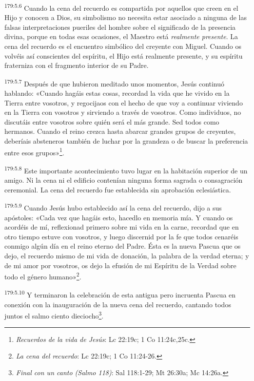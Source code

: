 \par 
\textsuperscript{179:5.6} Cuando la cena del recuerdo es compartida por aquellos que creen en el Hijo y conocen a Dios, su simbolismo no necesita estar asociado a ninguna de las falsas interpretaciones pueriles del hombre sobre el significado de la presencia divina, porque en todas esas ocasiones, el Maestro está \textit{realmente presente}. La cena del recuerdo es el encuentro simbólico del creyente con Miguel. Cuando os volvéis así conscientes del espíritu, el Hijo está realmente presente, y su espíritu fraterniza con el fragmento interior de su Padre.

\par 
\textsuperscript{179:5.7} Después de que hubieron meditado unos momentos, Jesús continuó hablando: «Cuando hagáis estas cosas, recordad la vida que he vivido en la Tierra entre vosotros, y regocijaos con el hecho de que voy a continuar viviendo en la Tierra con vosotros y sirviendo a través de vosotros. Como individuos, no discutáis entre vosotros sobre quién será el más grande. Sed todos como hermanos. Cuando el reino crezca hasta abarcar grandes grupos de creyentes, deberíais absteneros también de luchar por la grandeza o de buscar la preferencia entre esos grupos»\footnote{\textit{Recuerdos de la vida de Jesús}: Lc 22:19c; 1 Co 11:24c,25c.}.

\par 
\textsuperscript{179:5.8} Este importante acontecimiento tuvo lugar en la habitación superior de un amigo. Ni la cena ni el edificio contenían ninguna forma sagrada o consagración ceremonial. La cena del recuerdo fue establecida sin aprobación eclesiástica.

\par 
\textsuperscript{179:5.9} Cuando Jesús hubo establecido así la cena del recuerdo, dijo a sus apóstoles: «Cada vez que hagáis esto, hacedlo en memoria mía. Y cuando os acordéis de mí, reflexionad primero sobre mi vida en la carne, recordad que en otro tiempo estuve con vosotros, y luego discernid por la fe que todos cenaréis conmigo algún día en el reino eterno del Padre. Ésta es la nueva Pascua que os dejo, el recuerdo mismo de mi vida de donación, la palabra de la verdad eterna; y de mi amor por vosotros, os dejo la efusión de mi Espíritu de la Verdad sobre todo el género humano»\footnote{\textit{La cena del recuerdo}: Lc 22:19c; 1 Co 11:24-26.}.

\par 
\textsuperscript{179:5.10} Y terminaron la celebración de esta antigua pero incruenta Pascua en conexión con la inauguración de la nueva cena del recuerdo, cantando todos juntos el salmo ciento dieciocho\footnote{\textit{Final con un canto (Salmo 118)}: Sal 118:1-29; Mt 26:30a; Mc 14:26a.}.